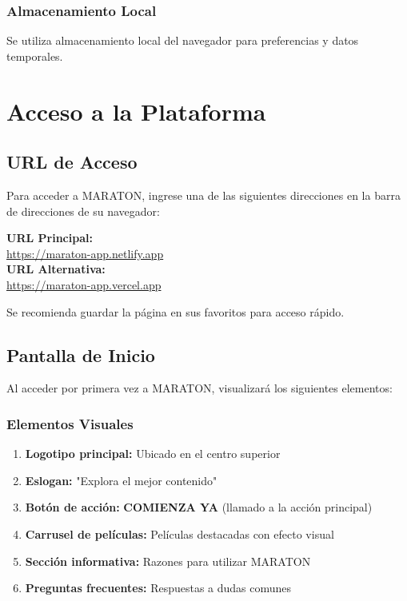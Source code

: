 \documentclass[11pt,a4paper,twoside]{book}
\begin{document}
\subsection{Almacenamiento Local}
Se utiliza almacenamiento local del navegador para preferencias y datos temporales.

\chapter{Acceso a la Plataforma}

\section{URL de Acceso}

Para acceder a MARATON, ingrese una de las siguientes direcciones en la barra de direcciones de su navegador:

\begin{center}
\begin{tcolorbox}[width=0.8\textwidth,colback=maratonlight,colframe=maratonblue]
\centering
\textbf{URL Principal:}\\
\url{https://maraton-app.netlify.app}\\[0.5cm]
\textbf{URL Alternativa:}\\
\url{https://maraton-app.vercel.app}
\end{tcolorbox}
\end{center}

\begin{notebox}
Se recomienda guardar la página en sus favoritos para acceso rápido.
\end{notebox}

\section{Pantalla de Inicio}

Al acceder por primera vez a MARATON, visualizará los siguientes elementos:

\subsection{Elementos Visuales}
\begin{enumerate}
    \item \textbf{Logotipo principal:} Ubicado en el centro superior
    \item \textbf{Eslogan:} "Explora el mejor contenido"
    \item \textbf{Botón de acción:} \textbf{COMIENZA YA} (llamado a la acción principal)
    \item \textbf{Carrusel de películas:} Películas destacadas con efecto visual
    \item \textbf{Sección informativa:} Razones para utilizar MARATON
    \item \textbf{Preguntas frecuentes:} Respuestas a dudas comunes
\end{enumerate}
\end{document}

